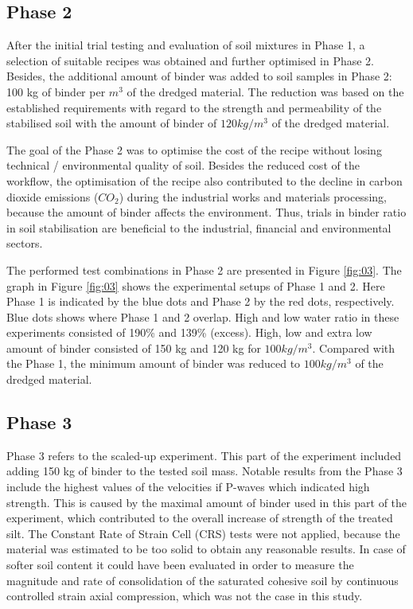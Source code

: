 \documentclass{amestyle}
\begin{document}
\subsection{Phase 2}

After the initial trial testing and evaluation of soil mixtures in Phase 1, a selection of suitable recipes was obtained and further optimised in Phase 2. Besides, the additional amount of binder was added to soil samples in Phase 2: 100 kg of binder per $m^3$ of the dredged material. The reduction was based on the established requirements with regard to the strength and permeability of the stabilised soil with the amount of binder of $120 kg/m^3$ of the dredged material. 

The goal of the Phase 2 was to optimise the cost of the recipe without losing technical / environmental quality of soil. Besides the reduced cost of the workflow, the optimisation of the recipe also contributed to the decline in carbon dioxide emissions ($CO_2$) during the industrial works and materials processing, because the amount of binder affects the environment. Thus, trials in binder ratio in soil stabilisation are beneficial to the industrial, financial and environmental sectors.

The performed test combinations in Phase 2 are presented in Figure \ref{fig:03}. The graph in Figure \ref{fig:03} shows the experimental setups of Phase 1 and 2. Here Phase 1 is indicated by the blue dots and Phase 2 by the red dots, respectively. Blue dots shows where Phase 1 and 2 overlap. High and low water ratio in these experiments consisted of 190\% and 139\% (excess). High, low and extra low amount of binder consisted of 150 kg and 120 kg for $100 kg/m^3$. Compared with the Phase 1, the minimum amount of binder was reduced to $100 kg/m^3$ of the dredged material. 

\subsection{Phase 3}

Phase 3 refers to the scaled-up experiment. This part of the experiment included adding 150 kg of binder to the tested soil mass. Notable results from the Phase 3 include the highest values of the velocities if P-waves which indicated high strength. This is caused by the maximal amount of binder used in this part of the experiment, which contributed to the overall increase of strength of the treated silt. The Constant Rate of Strain Cell (CRS) tests were not applied, because the material was estimated to be too solid to obtain any reasonable results. In case of softer soil content it could have been evaluated in order to measure the magnitude and rate of consolidation of the saturated cohesive soil by continuous controlled strain axial compression, which was not the case in this study. 
\end{document}
